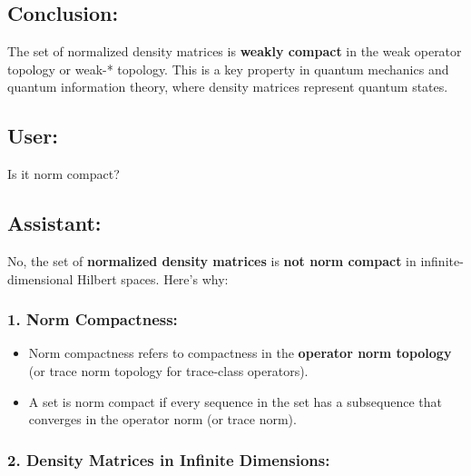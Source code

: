 \documentclass{article}
\begin{document}
\subsection*{Conclusion:}

The set of normalized density matrices is \textbf{weakly compact} in the
weak operator topology or weak-* topology. This is a key property in quantum
mechanics and quantum information theory, where density matrices represent
quantum states.

\subsection*{User:}

Is it norm compact?

\subsection*{Assistant:}

No, the set of \textbf{normalized density matrices} is \textbf{not norm
compact} in infinite-dimensional Hilbert spaces. Here's why:

\subsubsection*{1. \textbf{Norm Compactness}:}

\begin{itemize}
\item Norm compactness refers to compactness in the \textbf{operator norm
topology} (or trace norm topology for trace-class operators). 

\item A set is norm compact if every sequence in the set has a subsequence
that converges in the operator norm (or trace norm).
\end{itemize}

\subsubsection*{2. \textbf{Density Matrices in Infinite Dimensions}:}
\end{document}
